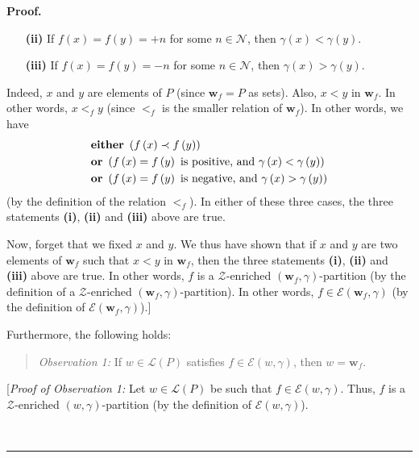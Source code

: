 \documentclass[numbers=enddot,12pt,final,onecolumn,notitlepage]{scrartcl}%
\theoremstyle{definition}
\newenvironment{statement}{\begin{quote}}{\end{quote}}
\newenvironment{proof}[1][Proof]{\noindent\textbf{#1.} }{\ \rule{0.5em}{0.5em}}
\newenvironment{verlong}{}{}
\begin{document}
\begin{verlong}
\begin{proof}
\begin{enumerate}
\item[\textbf{(ii)}] If $f\left(  x\right)  =f\left(  y\right)  =+n$ for some
$n\in\mathcal{N}$, then $\gamma\left(  x\right)  <\gamma\left(  y\right)  $.

\item[\textbf{(iii)}] If $f\left(  x\right)  =f\left(  y\right)  =-n$ for some
$n\in\mathcal{N}$, then $\gamma\left(  x\right)  >\gamma\left(  y\right)  $.
\end{enumerate}

Indeed, $x$ and $y$ are elements of $P$ (since $\mathbf{w}_{f}=P$ as sets).
Also, $x<y$ in $\mathbf{w}_{f}$. In other words, $x<_{f}y$ (since $<_{f}$ is
the smaller relation of $\mathbf{w}_{f}$). In other words, we have%
\begin{align*}
& \text{\textbf{either} }\left(  f\left(  x\right)  \prec f\left(  y\right)
\right)  \\
& \text{\textbf{or} }\left(  f\left(  x\right)  =f\left(  y\right)  \text{ is
positive, and }\gamma\left(  x\right)  <\gamma\left(  y\right)  \right)  \\
& \text{\textbf{or} }\left(  f\left(  x\right)  =f\left(  y\right)  \text{ is
negative, and }\gamma\left(  x\right)  >\gamma\left(  y\right)  \right)
\end{align*}
(by the definition of the relation $<_{f}$). In either of these three cases,
the three statements \textbf{(i)}, \textbf{(ii)} and \textbf{(iii)} above are true.

Now, forget that we fixed $x$ and $y$. We thus have shown that if $x$ and $y$
are two elements of $\mathbf{w}_{f}$ such that $x<y$ in $\mathbf{w}_{f}$, then
the three statements \textbf{(i)}, \textbf{(ii)} and \textbf{(iii)} above are
true. In other words, $f$ is a $\mathcal{Z}$-enriched $\left(  \mathbf{w}%
_{f},\gamma\right)  $-partition (by the definition of a $\mathcal{Z}%
$-enriched $\left(  \mathbf{w}_{f},\gamma\right)  $-partition). In other
words, $f\in\mathcal{E}\left(  \mathbf{w}_{f},\gamma\right)  $ (by the
definition of $\mathcal{E}\left(  \mathbf{w}_{f},\gamma\right)  $).]

Furthermore, the following holds:

\begin{statement}
\textit{Observation 1:} If $w\in\mathcal{L}\left(  P\right)  $ satisfies
$f\in\mathcal{E}\left(  w,\gamma\right)  $, then $w=\mathbf{w}_{f}$.
\end{statement}

[\textit{Proof of Observation 1:} Let $w\in\mathcal{L}\left(  P\right)  $ be
such that $f\in\mathcal{E}\left(  w,\gamma\right)  $. Thus, $f$ is a
$\mathcal{Z}$-enriched $\left(  w,\gamma\right)  $-partition (by the
definition of $\mathcal{E}\left(  w,\gamma\right)  $).


\end{proof}
\end{verlong}
\end{document}
